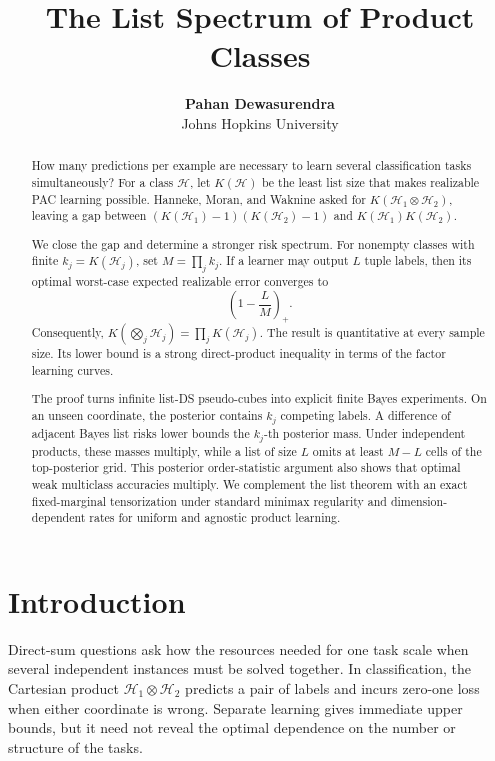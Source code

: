 \documentclass{article}
\title{The List Spectrum of Product Classes}
\author{\textbf{Pahan Dewasurendra} \\ Johns Hopkins University}
\theoremstyle{definition}
\theoremstyle{remark}
\newcommand{\cH}{\mathcal H}
\newcommand{\1}{\mathbf 1}
\begin{document}
\maketitle

\begin{abstract}
How many predictions per example are necessary to learn several classification tasks simultaneously? For a class \(\cH\), let \(K(\cH)\) be the least list size that makes realizable PAC learning possible. Hanneke, Moran, and Waknine asked for \(K(\cH_1\otimes\cH_2)\), leaving a gap between \((K(\cH_1)-1)(K(\cH_2)-1)\) and \(K(\cH_1)K(\cH_2)\).

We close the gap and determine a stronger risk spectrum. For nonempty classes with finite \(k_j=K(\cH_j)\), set \(M=\prod_j k_j\). If a learner may output \(L\) tuple labels, then its optimal worst-case expected realizable error converges to \[ \left(1-\frac{L}{M}\right)_+. \] Consequently, \(K(\bigotimes_j\cH_j)=\prod_jK(\cH_j)\). The result is quantitative at every sample size. Its lower bound is a strong direct-product inequality in terms of the factor learning curves.

The proof turns infinite list-DS pseudo-cubes into explicit finite Bayes experiments. On an unseen coordinate, the posterior contains \(k_j\) competing labels. A difference of adjacent Bayes list risks lower bounds the \(k_j\)-th posterior mass. Under independent products, these masses multiply, while a list of size \(L\) omits at least \(M-L\) cells of the top-posterior grid. This posterior order-statistic argument also shows that optimal weak multiclass accuracies multiply. We complement the list theorem with an exact fixed-marginal tensorization under standard minimax regularity and dimension-dependent rates for uniform and agnostic product learning.
\end{abstract}

\section{Introduction}

Direct-sum questions ask how the resources needed for one task scale when several independent instances must be solved together. In classification, the Cartesian product \(\cH_1\otimes\cH_2\) predicts a pair of labels and incurs zero-one loss when either coordinate is wrong. Separate learning gives immediate upper bounds, but it need not reveal the optimal dependence on the number or structure of the tasks.
\end{document}
